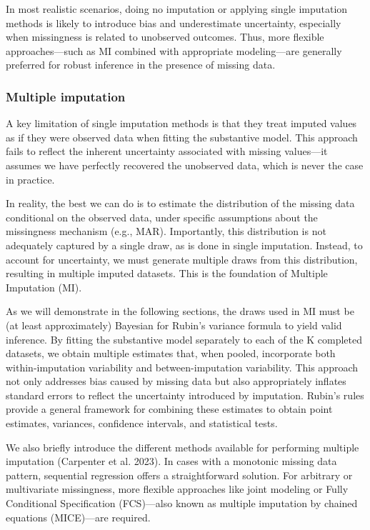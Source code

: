 \documentclass{article}
\begin{document}
In most realistic scenarios, doing no imputation or applying single
imputation methods is likely to introduce bias and underestimate
uncertainty, especially when missingness is related to unobserved
outcomes. Thus, more flexible approaches---such as MI combined with
appropriate modeling---are generally preferred for robust inference in
the presence of missing data.

\subsubsection{Multiple imputation}\label{multiple-imputation}

A key limitation of single imputation methods is that they treat imputed
values as if they were observed data when fitting the substantive model.
This approach fails to reflect the inherent uncertainty associated with
missing values---it assumes we have perfectly recovered the unobserved
data, which is never the case in practice.

In reality, the best we can do is to estimate the distribution of the
missing data conditional on the observed data, under specific
assumptions about the missingness mechanism (e.g., MAR). Importantly,
this distribution is not adequately captured by a single draw, as is
done in single imputation. Instead, to account for uncertainty, we must
generate multiple draws from this distribution, resulting in multiple
imputed datasets. This is the foundation of Multiple Imputation (MI).

As we will demonstrate in the following sections, the draws used in MI
must be (at least approximately) Bayesian for Rubin's variance formula
to yield valid inference. By fitting the substantive model separately to
each of the K completed datasets, we obtain multiple estimates that,
when pooled, incorporate both within-imputation variability and
between-imputation variability. This approach not only addresses bias
caused by missing data but also appropriately inflates standard errors
to reflect the uncertainty introduced by imputation. Rubin's rules
provide a general framework for combining these estimates to obtain
point estimates, variances, confidence intervals, and statistical tests.

We also briefly introduce the different methods available for performing
multiple imputation (Carpenter et al. 2023). In cases with a monotonic
missing data pattern, sequential regression offers a straightforward
solution. For arbitrary or multivariate missingness, more flexible
approaches like joint modeling or Fully Conditional Specification
(FCS)---also known as multiple imputation by chained equations
(MICE)---are required.
\end{document}
